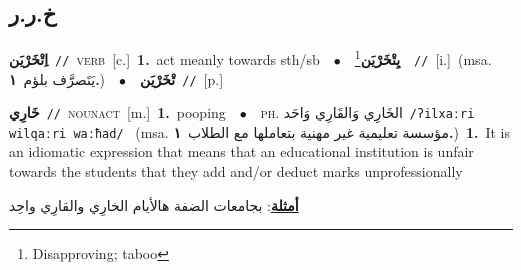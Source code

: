 \documentclass[10pt,a4paper,twoside]{article} %
\begin{document}
\begin{multicols}{2}
{{{{{{{{{{{{{{\vspace{-3mm}
\subsection*{\color{blue}\foreignlanguage{arabic}{خ.ر.ر}\color{blue}{}} 

{\setlength\topsep{0pt}\textbf{\foreignlanguage{arabic}{اِتْخَرْيَن}}\ {\color{gray}\texttt{//}\color{black}}\ \textsc{verb}\ [c.]\ \textbf{1.}~act meanly towards sth/sb\ \ $\bullet$\ \ \setlength\topsep{0pt}\textbf{\foreignlanguage{arabic}{يِتْخَرْيَن}}\footnote{Disapproving; taboo}\ \ {\color{gray}\texttt{//}\color{black}}\ [i.]\ \color{gray}(msa. \foreignlanguage{arabic}{يَتَصرَّف بلؤم}~\foreignlanguage{arabic}{\textbf{١.}})\color{black}\ \ $\bullet$\ \ \setlength\topsep{0pt}\textbf{\foreignlanguage{arabic}{تْخَرْيَن}}\ {\color{gray}\texttt{//}\color{black}}\ [p.]\ 

{\setlength\topsep{0pt}\textbf{\foreignlanguage{arabic}{خَارِي}}\ {\color{gray}\texttt{//}\color{black}}\ \textsc{noun\textunderscore act}\ [m.]\ \textbf{1.}~pooping\ \ $\bullet$\ \ \textsc{ph.} \color{gray} \foreignlanguage{arabic}{الخَارِي وَالقَارِي وَاحَد}\color{black}\ {\color{gray}\texttt{/{\sffamily ʔilxaːri wilqaːri waːħad}/}\color{black}}\ \color{gray} (msa. \foreignlanguage{arabic}{مؤسسة تعليمية غير مهنية بتعاملها مع الطلاب}~\foreignlanguage{arabic}{\textbf{١.}})\color{black}\ \textbf{1.}~It is an idiomatic expression that means that an educational institution is unfair towards the students that they add and/or deduct marks unprofessionally\  \begin{flushright}\color{gray}\foreignlanguage{arabic}{\textbf{\underline{\foreignlanguage{arabic}{أمثلة}}}: بجامعات الضفة هالأيام الخارِي والقارِي واحِد}\end{flushright}\color{black}} \vspace{2mm}

}}}}}}}}}}}}}}}
\end{multicols}
\end{document}
